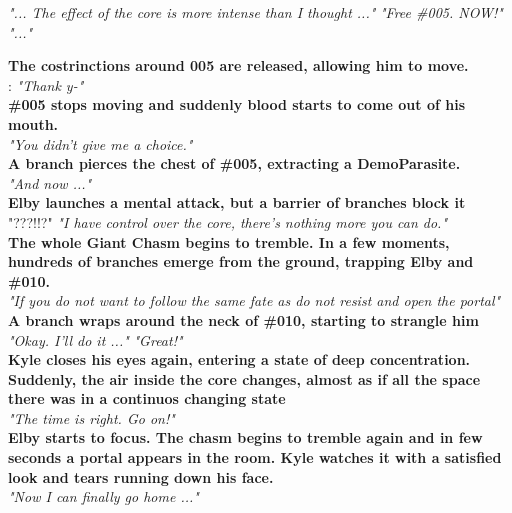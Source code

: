 \begin{dialogue}
	 \textit{"... The effect of the core is more intense than I thought ..."}
	 \textit{"Free \#005. NOW!"}
	 \textit{"..."}
	
	\textbf{The costrinctions around 005 are released, allowing him to move.}\\
	
	: \textit{"Thank y-"}\\
	
	\textbf{\#005 stops moving and suddenly blood starts to come out of his mouth.}\\
	
	 \textit{"You didn't give me a choice."}\\
	
	\textbf{A branch pierces the chest of \#005, extracting a DemoParasite.}\\
	
	 
	 
	 \textit{"And now ..."}
	 
	 \\
	
	\textbf{Elby launches a mental attack, but a barrier of branches block it}\\
	 "???!!?"
	 
	 \textit{"I have control over the core, there's nothing more you can do."}\\
	
	\textbf{The whole Giant Chasm begins to tremble. In a few moments, hundreds of branches emerge from the ground, trapping Elby and \#010.}\\
	
	 \textit{"If you do not want to follow the same fate as  do not resist and open the portal"}\\
	
	\textbf{A branch wraps around the neck of \#010, starting to strangle him}\\
	
	  \textit{"Okay. I'll do it ..."}
	 \textit{"Great!"}\\
	
	\textbf{Kyle closes his eyes again, entering a state of deep concentration. Suddenly, the air inside the core changes, almost as if all the space there was in a continuos changing state}\\
	
	 \textit{"The time is right. Go on!"}\\
	
	\textbf{Elby starts to focus. The chasm begins to tremble again and in few seconds a portal appears in the room. Kyle watches it with a satisfied look and tears running down his face.}\\
	
	 \textit{"Now I can finally go home ..."}
\end{dialogue}
